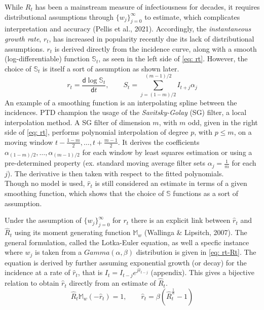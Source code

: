 \documentclass[12pt]{article}
\renewcommand{\d}{\mathsf{d}}
\begin{document}
      While $R_t$ has been a mainstream measure of infectiousness for decades, it requires distributional assumptions 
      through $\{w_j\}_{j=0}^\infty$ to estimate, which complicates interpretation and accuracy (Pellis et al., 2021). 
      Accordingly, the \textit{instantaneous growth rate}, 
      $r_t$, has increased in popularity recently due its lack of distributional assumptions. $r_t$ is derived directly from
      the incidence curve, along with a smooth (log-differentiable) function $\mathbb{S}_t$, as seen in the left side of 
      \cref{eq: rt}. However, the choice of $\mathbb{S}_t$ is itself a sort of assumption as shown later.
      \begin{equation} \label{eq: rt}
        r_t = \frac{\d \log{\mathbb{S}_t}}{\d t}, \qquad S_t = \sum_{j = (1 - m)/2}^{(m  - 1)/2} I_{t + j}\alpha_j
      \end{equation}
      An example of a smoothing function is an interpolating spline between the incidences. PTD champion the
      usage of the \textit{Savitsky-Golay} (SG) filter, a local interpolation method. A SG filter of dimension $m$, with 
      $m$ odd, given in the right side of \cref{eq: rt}, performs polynomial interpolation of degree $p$, with $p \leq m$, on a 
      moving window $t - \frac{1 - m}{2}, \dots, t + \frac{m  - 1}{2}$. It derives the coefficients 
      $\alpha_{(1 - m)/2},\dots,\alpha_{(m  - 1)/2}$ for each window by least squares estimation or using a 
      pre-determined property (ex. standard moving average filter sets $\alpha_j = \frac{1}{m}$ for each $j$). The 
      derivative is then taken with respect to the fitted polynomials. \\
      
      Though no model is used, $\hat{r}_t$ is still considered an estimate in terms of a given smoothing function, which shows that 
      the choice of $\mathbb{S}$ functions as a sort of assumption. 
      
      Under the assumption of $\{w_j\}_{j=0}^\infty$ for $r_t$ there is an explicit link between $\hat{r}_t$ 
      and $\hat{R}_t$ using its moment generating function $\mathbb{M}_w$
      (Wallinga \& Lipsitch, 2007). The general formulation, called the Lotka-Euler equation,
      as well a specfic instance where $w_j$ is taken from a 
      $Gamma(\alpha, \beta)$ distribution is given in \cref{eq: rt-Rt}. The equation is derived by further assuming 
      exponential growth (or decay) for the incidence at a rate of $\hat{r}_t$, that is $I_t = I_{t-j} e^{j \hat{r}_{t - j}}$
      (appendix). This gives a bijective relation to obtain $\hat{r}_t$ directly from an estimate of $\hat{R}_t$. 
      \begin{equation} \label{eq: rt-Rt}
        \hat{R}_t \mathbb{M}_w(-\hat{r}_t) = 1, \qquad \hat{r}_t = \beta(\hat{R}_t^{\frac{1}{\alpha}} - 1)
      \end{equation}
\end{document}
